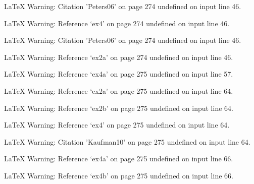 LaTeX Warning: Citation 'Peters06' on page 274 undefined on input line 46.


LaTeX Warning: Reference `ex4' on page 274 undefined on input line 46.


LaTeX Warning: Citation 'Peters06' on page 274 undefined on input line 46.


LaTeX Warning: Reference `ex2a' on page 274 undefined on input line 46.


LaTeX Warning: Reference `ex4a' on page 275 undefined on input line 57.


LaTeX Warning: Reference `ex2a' on page 275 undefined on input line 64.


LaTeX Warning: Reference `ex2b' on page 275 undefined on input line 64.


LaTeX Warning: Reference `ex4' on page 275 undefined on input line 64.


LaTeX Warning: Citation 'Kaufman10' on page 275 undefined on input line 64.


LaTeX Warning: Reference `ex4a' on page 275 undefined on input line 66.


LaTeX Warning: Reference `ex4b' on page 275 undefined on input line 66.

